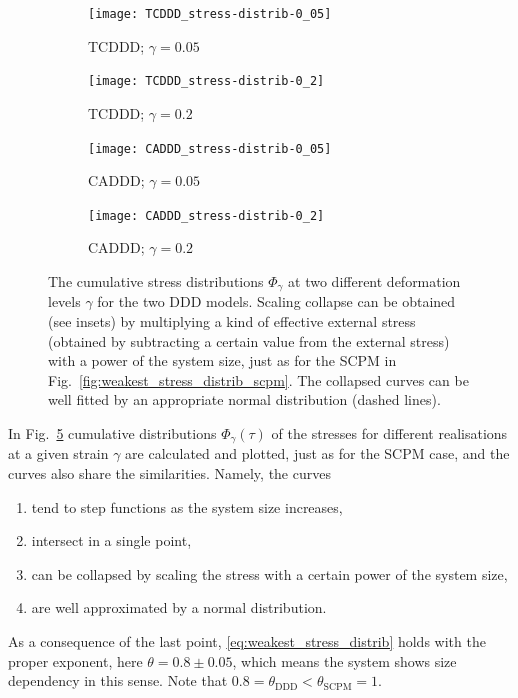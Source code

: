 \begin{figure}[htbp!] 
  \centering
  \begin{subfigure}[b]{0.48\textwidth}
    \texttt{[image: TCDDD\_stress-distrib-0\_05]}
    \caption{TCDDD; $\gamma = 0.05$}
    \label{fig:weakest_stress_distrib_ddd_TCDDD_005}   
  \end{subfigure}          
  \begin{subfigure}[b]{0.48\textwidth}
    \texttt{[image: TCDDD\_stress-distrib-0\_2]}
    \caption{TCDDD; $\gamma = 0.2$}
    \label{fig:weakest_stress_distrib_ddd_TCDDD_02}   
  \end{subfigure}             
  \begin{subfigure}[b]{0.48\textwidth}
    \texttt{[image: CADDD\_stress-distrib-0\_05]}
    \caption{CADDD; $\gamma = 0.05$}
    \label{fig:weakest_stress_distrib_ddd_CADDD_005}   
  \end{subfigure}          
  \begin{subfigure}[b]{0.48\textwidth}
    \texttt{[image: CADDD\_stress-distrib-0\_2]}
    \caption{CADDD; $\gamma = 0.2$}
    \label{fig:weakest_stress_distrib_ddd_CADDD_02}   
  \end{subfigure}             
  \caption[Stress sequences for the DDDs]{The cumulative stress distributions $\Phi_\gamma$ at two different deformation levels $\gamma$ for the two DDD models. Scaling collapse can be obtained (see insets) by multiplying a kind of effective external stress (obtained by subtracting a certain value from the external stress) with a power of the system size, just as for the SCPM in Fig.~\ref{fig:weakest_stress_distrib_scpm}. The collapsed curves can be well fitted by an appropriate normal distribution (dashed lines).}
  \label{fig:weakest_stress_distrib_ddd}
\end{figure}



In Fig.~\ref{fig:weakest_stress_distrib_ddd} cumulative distributions ${\Phi _\gamma }\left( \tau  \right)$ of the stresses for different realisations at a given strain $\gamma$ are calculated and plotted, just as for the SCPM case, and the curves also share the similarities. Namely, the curves
\begin{enumerate}
\item tend to step functions as the system size increases,
\item intersect in a single point,
\item can be collapsed by scaling the stress with a certain power of the system size,
\item are well approximated by a normal distribution.
\end{enumerate}
As a consequence of the last point, \cref{eq:weakest_stress_distrib} holds with the proper exponent, here $\theta  = 0.8 \pm 0.05$, which means the system shows size dependency in this sense. Note that $0.8 = {\theta _{{\text{DDD}}}} < {\theta _{{\text{SCPM}}}} = 1$.




